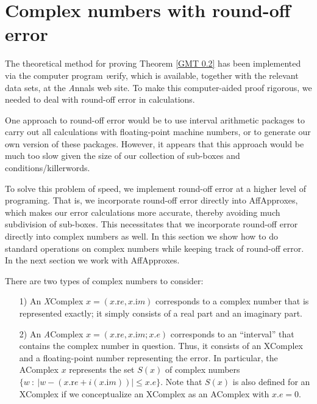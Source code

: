 \chapter{Complex numbers with round-off error}


\begin{remark} \label{GMT 7.1}
The theoretical method for proving Theorem \ref{GMT 0.2}
has been implemented via the computer program {\textit verify}, which is available, together with the relevant data sets, at the {\textit Annals} web site.  To make this computer-aided proof rigorous, we needed to deal with round-off error in calculations.  

One approach to round-off error would be to use interval arithmetic packages to carry out all calculations with floating-point machine numbers, or to generate our own version of these packages.  
However, it appears that this approach
would be much too slow given the size of our collection of sub-boxes and conditions/killerwords.  

To solve this problem of speed, we implement round-off error at a higher level of programing.  That is, we incorporate round-off error directly
 into AffApproxes,  which makes our error calculations more accurate, thereby avoiding much subdivision of
sub-boxes. This necessitates that we incorporate round-off error directly into complex numbers as well. 
In this section we show how to do standard operations on complex numbers while keeping track of round-off error.
In the next section we work with  AffApproxes.\end{remark}

\begin{definition}\label{GMT 7.2}
There are two types of complex numbers to consider: 

\begin{itemize}
\item[1)]  An {\textit XComplex} $x = (x.{\mathrm re}, x.{\mathrm im})$ corresponds to a complex number that is represented exactly; it
simply consists of a real part and an imaginary part.

\item[2)]  An {\textit AComplex} $x = (x.{\mathrm re}, x.{\mathrm im}; x.e)$ corresponds to an ``interval'' that contains the complex number in
question.  Thus, it consists of an XComplex and a floating-point number representing the error.  In particular, the AComplex
$x$ represents the set $S(x)$ of complex numbers 
$\{w\ :\ |w - (x.{\mathrm re} + i (x.{\mathrm im}))| \le x.e\}$.  Note that $S(x)$ is also defined
for an XComplex if we conceptualize an XComplex as an AComplex with
$x.e = 0.$
\end{itemize}

\end{definition}

